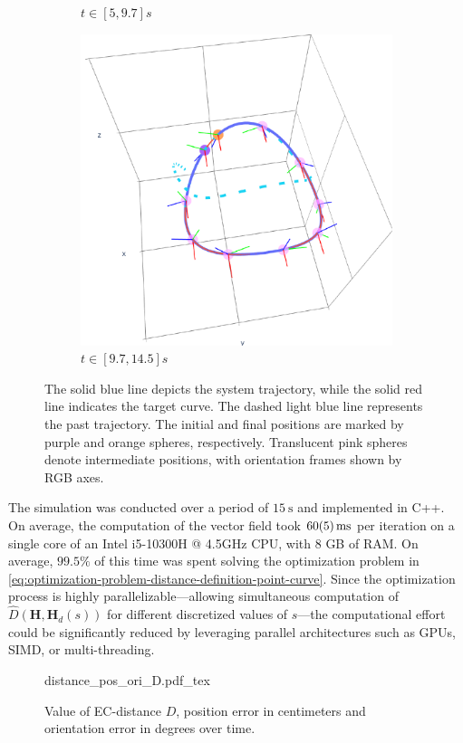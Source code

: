 \begin{figure}[ht!]
\begin{subfigure}[b]{0.32\textwidth}
        \caption{$t\in[5, 9.7]s$}
        \label{fig:vfplot-second}
    \end{subfigure}
    \hfill
    \begin{subfigure}[b]{0.32\textwidth}
        \centering
        \includegraphics[width=\textwidth]{figures/vf_automatica_3.pdf} %
        \caption{$t\in[9.7, 14.5]s$}
        \label{fig:vfplot-third}
    \end{subfigure}
    \caption{The solid blue line depicts the system trajectory, while the solid red line indicates the target curve. The dashed light blue line represents the past trajectory. The initial and final positions are marked by purple and orange spheres, respectively. Translucent pink spheres denote intermediate positions, with orientation frames shown by RGB axes.}
    \label{fig:vfplot-trajectory}
\end{figure}
The simulation was conducted over a period of $\qty{15}{\second}$ and implemented in C++. On average, the computation of the vector field took $\qty{60 \pm 5}{\milli\second}$ per iteration on a single core of an Intel i5-10300H @ 4.5GHz CPU, with 8 GB of RAM. On average, $99.5\%$ of this time was spent solving the optimization problem in \eqref{eq:optimization-problem-distance-definition-point-curve}. Since the optimization process is highly parallelizable---allowing simultaneous computation of $\widehat{D}(\mathbf{H},\mathbf{H}_d(s))$ for different discretized values of $s$---the computational effort could be significantly reduced by leveraging parallel architectures such as GPUs, SIMD, or multi-threading.
\begin{figure}[ht!]
    \centering
    \def\svgwidth{\linewidth}
    {\footnotesize{distance_pos_ori_D.pdf_tex}}
    \caption{Value of EC-distance $D$, position error in centimeters and orientation error in degrees over time.}
    \label{fig:position-orientation-errors}
\end{figure}


